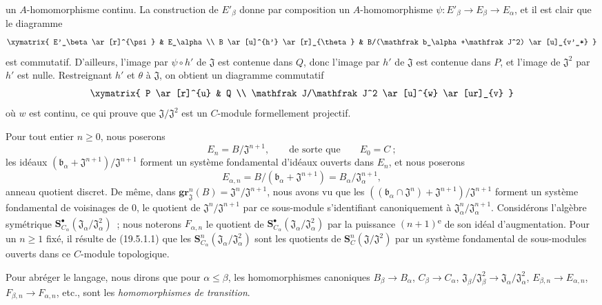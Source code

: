 \begin{env}[19.5.6.1]
un $A$-homomorphisme continu. La construction de $E'_\beta$ donne par
composition un $A$-homomorphisme $\psi:E'_\beta\to E_\beta\to E_\alpha$, et
il est clair que le diagramme
\[
  \xymatrix{
    E'_\beta \ar[r]^{\psi} & E_\alpha \\
    B \ar[u]^{h'} \ar[r]_{\theta} &
    B/(\mathfrak b_\alpha+\mathfrak J^2) \ar[u]_{v'_*}
  }
\]
est commutatif. D'ailleurs, l'image par $\psi\circ h'$ de $\mathfrak J$ est
contenue dans $Q$, donc l'image par $h'$ de $\mathfrak J$ est contenue dans
$P$, et l'image de $\mathfrak J^2$ par $h'$ est nulle. Restreignant $h'$ et
$\theta$ à $\mathfrak J$, on obtient un diagramme commutatif
\[
  \xymatrix{
    P \ar[r]^{u} & Q \\
    \mathfrak J/\mathfrak J^2 \ar[u]^{w} \ar[ur]_{v}
  }
\]
où $w$ est continu, ce qui prouve que
$\mathfrak J/\mathfrak J^2$ est un $C$-module formellement projectif.
\end{env}

\begin{env}[19.5.6.2]
\label{0.19.5.6.2-fr}
Pour tout entier $n\geq0$, nous poserons
\[
  E_n=B/\mathfrak J^{n+1},
  \qquad\text{de sorte que}\qquad E_0=C~;
\]
les idéaux $(\mathfrak b_\alpha+\mathfrak J^{n+1})/\mathfrak J^{n+1}$ forment
un système fondamental d'idéaux ouverts dans $E_n$, et nous poserons
\[
  E_{\alpha,n}=B/(\mathfrak b_\alpha+\mathfrak J^{n+1})
  =B_\alpha/\mathfrak J_\alpha^{n+1},
\]
anneau quotient discret. De même, dans
$\mathbf{gr}_{\mathfrak J}^n(B)=\mathfrak J^n/\mathfrak J^{n+1}$, nous avons vu que les
$((\mathfrak b_\alpha\cap\mathfrak J^n)+\mathfrak J^{n+1})/
\mathfrak J^{n+1}$ forment un système fondamental de voisinages de $0$, le
quotient de $\mathfrak J^n/\mathfrak J^{n+1}$ par ce sous-module s'identifiant
canoniquement à $\mathfrak J_\alpha^n/\mathfrak J_\alpha^{n+1}$. Considérons
l'algèbre symétrique
$\mathbf S_{C_\alpha}^\bullet(\mathfrak J_\alpha/\mathfrak J_\alpha^2)$~; nous
noterons $F_{\alpha,n}$ le quotient de
$\mathbf S_{C_\alpha}^\bullet(\mathfrak J_\alpha/\mathfrak J_\alpha^2)$ par la
puissance $(n+1)$\textsuperscript{e} de son idéal d'augmentation. Pour un $n\geq1$ fixé, il
résulte de (19.5.1.1) que les
$\mathbf S_{C_\alpha}^n(\mathfrak J_\alpha/\mathfrak J_\alpha^2)$ sont les
quotients de $\mathbf S_C^n(\mathfrak J/\mathfrak J^2)$ par un système
fondamental de sous-modules ouverts dans ce $C$-module topologique.

Pour abréger le langage, nous dirons que pour $\alpha\leq\beta$, les
homomorphismes canoniques $B_\beta\to B_\alpha$, $C_\beta\to C_\alpha$,
$\mathfrak J_\beta/\mathfrak J_\beta^2\to
\mathfrak J_\alpha/\mathfrak J_\alpha^2$, $E_{\beta,n}\to E_{\alpha,n}$,
$F_{\beta,n}\to F_{\alpha,n}$, etc., sont les \emph{homomorphismes de
transition}.
\end{env}

